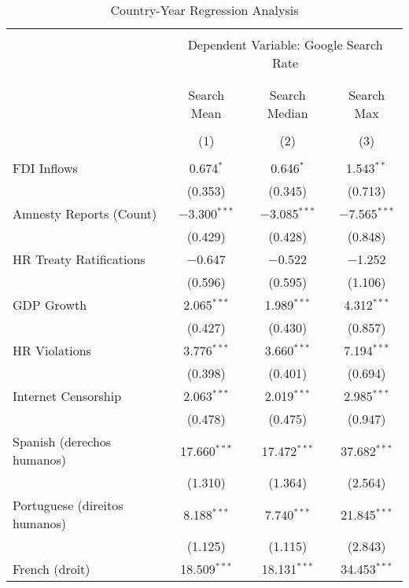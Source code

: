 
\begin{table}[!htbp] \centering 
  \caption{Country-Year Regression Analysis} 
  \label{} 
\begin{tabular}{@{\extracolsep{5pt}}lccc} 
\\[-1.8ex]\hline 
\hline \\[-1.8ex] 
 & \multicolumn{3}{c}{Dependent Variable: Google Search Rate} \\ 
\cline{2-4} 
\\[-1.8ex] & \multicolumn{3}{c}{ } \\ 
 & Search Mean & Search Median & Search Max \\ 
\\[-1.8ex] & (1) & (2) & (3)\\ 
\hline \\[-1.8ex] 
 FDI Inflows & 0.674$^{*}$ & 0.646$^{*}$ & 1.543$^{**}$ \\ 
  & (0.353) & (0.345) & (0.713) \\ 
  Amnesty Reports (Count) & $-$3.300$^{***}$ & $-$3.085$^{***}$ & $-$7.565$^{***}$ \\ 
  & (0.429) & (0.428) & (0.848) \\ 
  HR Treaty Ratifications & $-$0.647 & $-$0.522 & $-$1.252 \\ 
  & (0.596) & (0.595) & (1.106) \\ 
  GDP Growth & 2.065$^{***}$ & 1.989$^{***}$ & 4.312$^{***}$ \\ 
  & (0.427) & (0.430) & (0.857) \\ 
  HR Violations & 3.776$^{***}$ & 3.660$^{***}$ & 7.194$^{***}$ \\ 
  & (0.398) & (0.401) & (0.694) \\ 
  Internet Censorship & 2.063$^{***}$ & 2.019$^{***}$ & 2.985$^{***}$ \\ 
  & (0.478) & (0.475) & (0.947) \\ 
  Spanish (derechos humanos) & 17.660$^{***}$ & 17.472$^{***}$ & 37.682$^{***}$ \\ 
  & (1.310) & (1.364) & (2.564) \\ 
  Portuguese (direitos humanos) & 8.188$^{***}$ & 7.740$^{***}$ & 21.845$^{***}$ \\ 
  & (1.125) & (1.115) & (2.843) \\ 
  French (droit) & 18.509$^{***}$ & 18.131$^{***}$ & 34.453$^{***}$ \\ 

\end{tabular}
\end{table}
